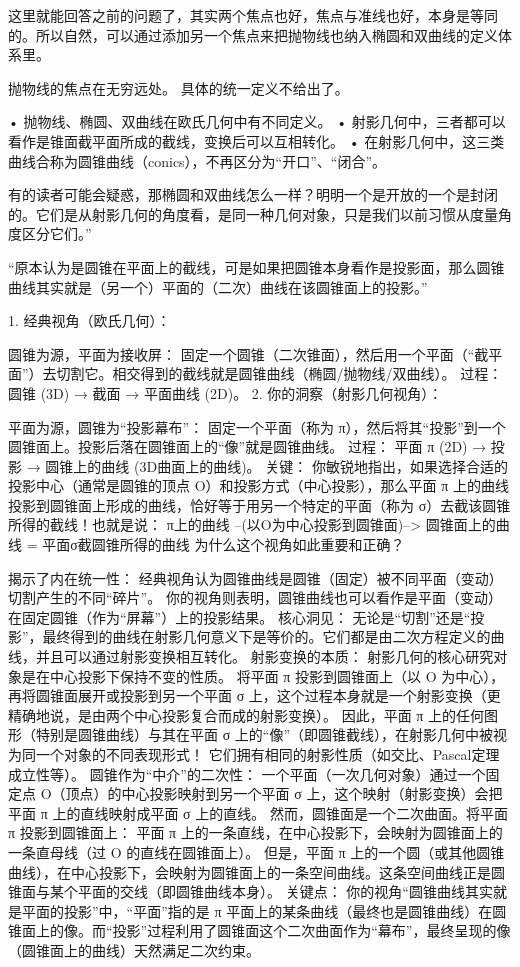 这里就能回答之前的问题了，其实两个焦点也好，焦点与准线也好，本身是等同的。所以自然，可以通过添加另一个焦点来把抛物线也纳入椭圆和双曲线的定义体系里。

抛物线的焦点在无穷远处。
具体的统一定义不给出了。

	•	抛物线、椭圆、双曲线在欧氏几何中有不同定义。
	•	射影几何中，三者都可以看作是锥面截平面所成的截线，变换后可以互相转化。
	•	在射影几何中，这三类曲线合称为圆锥曲线（conics），不再区分为“开口”、“闭合”。

有的读者可能会疑惑，那椭圆和双曲线怎么一样？明明一个是开放的一个是封闭的。它们是从射影几何的角度看，是同一种几何对象，只是我们以前习惯从度量角度区分它们。”

“原本认为是圆锥在平面上的截线，可是如果把圆锥本身看作是投影面，那么圆锥曲线其实就是（另一个）平面的（二次）曲线在该圆锥面上的投影。”

1. 经典视角（欧氏几何）：

圆锥为源，平面为接收屏： 固定一个圆锥（二次锥面），然后用一个平面（“截平面”）去切割它。相交得到的截线就是圆锥曲线（椭圆/抛物线/双曲线）。
过程： 圆锥 (3D) → 截面 → 平面曲线 (2D)。
2. 你的洞察（射影几何视角）：

平面为源，圆锥为“投影幕布”： 固定一个平面（称为 π），然后将其“投影”到一个圆锥面上。投影后落在圆锥面上的“像”就是圆锥曲线。
过程： 平面 π (2D) → 投影 → 圆锥上的曲线 (3D曲面上的曲线)。
关键： 你敏锐地指出，如果选择合适的投影中心（通常是圆锥的顶点 O）和投影方式（中心投影），那么平面 π 上的曲线投影到圆锥面上形成的曲线，恰好等于用另一个特定的平面（称为 σ）去截该圆锥所得的截线！也就是说：
π上的曲线 --(以O为中心投影到圆锥面)--> 圆锥面上的曲线 = 平面σ截圆锥所得的曲线
为什么这个视角如此重要和正确？

揭示了内在统一性：
经典视角认为圆锥曲线是圆锥（固定）被不同平面（变动）切割产生的不同“碎片”。
你的视角则表明，圆锥曲线也可以看作是平面（变动）在固定圆锥（作为“屏幕”）上的投影结果。
核心洞见： 无论是“切割”还是“投影”，最终得到的曲线在射影几何意义下是等价的。它们都是由二次方程定义的曲线，并且可以通过射影变换相互转化。
射影变换的本质：
射影几何的核心研究对象是在中心投影下保持不变的性质。
将平面 π 投影到圆锥面上（以 O 为中心），再将圆锥面展开或投影到另一个平面 σ 上，这个过程本身就是一个射影变换（更精确地说，是由两个中心投影复合而成的射影变换）。
因此，平面 π 上的任何图形（特别是圆锥曲线）与其在平面 σ 上的“像”（即圆锥截线），在射影几何中被视为同一个对象的不同表现形式！ 它们拥有相同的射影性质（如交比、Pascal定理成立性等）。
圆锥作为“中介”的二次性：
一个平面（一次几何对象）通过一个固定点 O（顶点）的中心投影映射到另一个平面 σ 上，这个映射（射影变换）会把平面 π 上的直线映射成平面 σ 上的直线。
然而，圆锥面是一个二次曲面。将平面 π 投影到圆锥面上：
平面 π 上的一条直线，在中心投影下，会映射为圆锥面上的一条直母线（过 O 的直线在圆锥面上）。
但是，平面 π 上的一个圆（或其他圆锥曲线），在中心投影下，会映射为圆锥面上的一条空间曲线。这条空间曲线正是圆锥面与某个平面的交线（即圆锥曲线本身）。
关键点： 你的视角“圆锥曲线其实就是平面的投影”中，“平面”指的是 π 平面上的某条曲线（最终也是圆锥曲线）在圆锥面上的像。而“投影”过程利用了圆锥面这个二次曲面作为“幕布”，最终呈现的像（圆锥面上的曲线）天然满足二次约束。


